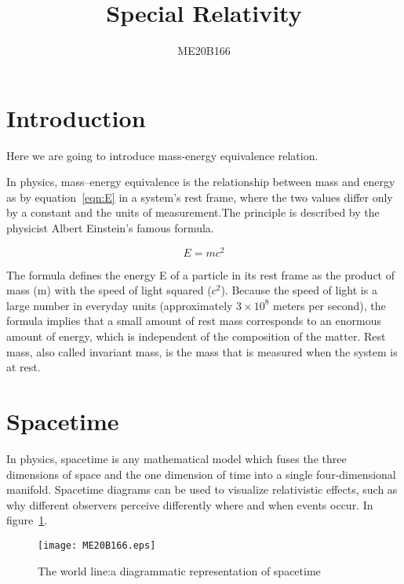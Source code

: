 \documentclass[a4paper, 12pt]{article}
\begin{document}
\title{Special Relativity}
\author{ME20B166}
\maketitle

\tableofcontents

\listoffigures


\section{Introduction}

Here we are going to introduce mass-energy equivalence relation.

In physics, mass–energy equivalence is the relationship between mass and energy as by equation~\ref{eqn:E} in a system's rest frame, where the two values differ only by a constant and the units of measurement.The principle is described by the physicist Albert Einstein's famous formula.~\cite{Einstie}

\begin{equation}
	E=mc^2
	\label{eqn:E}
\end{equation}

The formula defines the energy E of a particle in its rest frame as the product of mass (m) with the speed of light squared ($c^2$). Because the speed of light is a large number in everyday units (approximately $3 \times 10 ^8$ meters per second), the formula implies that a small amount of rest mass corresponds to an enormous amount of energy, which is independent of the composition of the matter. Rest mass, also called invariant mass, is the mass that is measured when the system is at rest.


\section{Spacetime}

In physics, spacetime is any mathematical model which fuses the three dimensions of space and the one dimension of time into a single four-dimensional manifold. Spacetime diagrams can be used to visualize relativistic effects, such as why different observers perceive differently where and when events occur. In figure~\ref{f1:spacetime}.~\cite{Einstie}

\begin{figure}[h]
	\begin{center}
		\texttt{[image: ME20B166.eps]}
	\end{center}
	\caption{The world line:a diagrammatic representation of spacetime}
	\label{f1:spacetime}
\end{figure}



\end{document}
